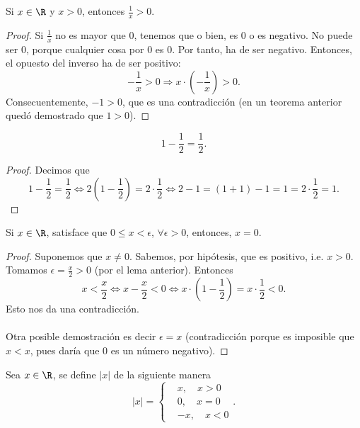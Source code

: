 \begin{flema}[]
\normalfont Si $\displaystyle x \in \R $ y $\displaystyle x > 0 $, entonces $\displaystyle \frac{1}{x} > 0 $. 
\end{flema}

\begin{proof}
Si $\displaystyle \frac{1}{x} $ no es mayor que 0, tenemos que o bien, es 0 o es negativo. No puede ser 0, porque cualquier cosa por 0 es 0. Por tanto, ha de ser negativo. Entonces, el opuesto del inverso ha de ser positivo:
\[-\frac{1}{x} > 0 \Rightarrow x \cdot \left(-\frac{1}{x}\right) > 0 .\]
Consecuentemente, $\displaystyle -1 > 0 $, que es una contradicción (en un teorema anterior quedó demostrado que $\displaystyle 1 >0 $).
\end{proof}

\begin{flema}[]
\normalfont 
\[1 - \frac{1}{2} = \frac{1}{2} .\]
\end{flema}

\begin{proof}
Decimos que
\[1 - \frac{1}{2} = \frac{1}{2} \iff 2\left(1 - \frac{1}{2}\right) = 2 \cdot \frac{1}{2} \iff 2 - 1 = \left(1 + 1\right) - 1 = 1 = 2 \cdot \frac{1}{2} = 1 .\]
\end{proof}

\begin{ftheorem}[Aproximación]
\normalfont Si $\displaystyle x \in \R $, satisface que $\displaystyle 0 \leq x < \epsilon  $, $\displaystyle \forall \epsilon >0 $, entonces, $\displaystyle x = 0 $. 
\end{ftheorem}

\begin{proof}
Suponemos que $\displaystyle x \neq 0$. Sabemos, por hipótesis, que es positivo, i.e. $\displaystyle x>0 $. Tomamos $\displaystyle \epsilon = \frac{x}{2}>0 $ (por el lema anterior). Entonces
\[x < \frac{x}{2} \iff x - \frac{x}{2} < 0 \iff x \cdot \left(1 - \frac{1}{2}\right) = x \cdot \frac{1}{2}<0 .\]
Esto nos da una contradicción. \\ \\
Otra posible demostración es decir $\displaystyle \epsilon = x $ (contradicción porque es imposible que $\displaystyle x < x $, pues daría que 0 es un número negativo).
\end{proof}

\begin{fdefinition}
\normalfont Sea $\displaystyle x \in \R $, se define $\displaystyle \left|x\right| $ de la siguiente manera
\[ \left|x\right| = 
\begin{cases}
& x, \quad x > 0 \\
& 0, \quad x = 0 \\
& -x, \quad x < 0
\end{cases}
.\]

\end{fdefinition}

